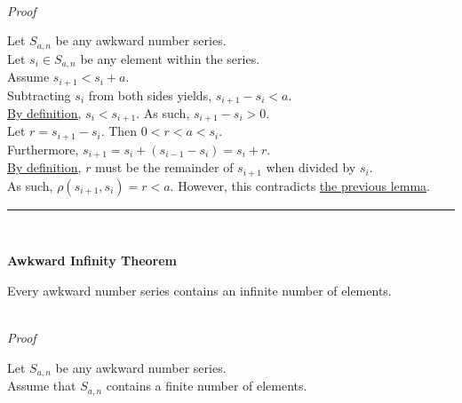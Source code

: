 \documentclass[a4paper,12pt]{article}
\begin{document}
\noindent \\
\textit{Proof}

\noindent Let $S_{a, n}$ be any awkward number series.\\

\noindent Let $s_i \in S_{a, n}$ be any element within the series.\\

\noindent Assume $s_{i + 1} < s_i + a$.\\

\noindent Subtracting $s_i$ from both sides yields, $s_{i + 1} - s_i < a$.\\

\noindent \hyperlink{definition:awkward_number_series}{By definition}, $s_i < s_{i + 1}$. As such, $s_{i + 1} - s_i > 0$.\\

\noindent Let $r = s_{i + 1} - s_i$. Then $0 < r < a < s_i$.\\

\noindent Furthermore, $s_{i + 1} = s_i + (s_{i - 1} - s_i) = s_i + r$.\\

\noindent \hyperlink{theorem:remainder_theorem}{By definition}, $r$ must be the remainder of $s_{i + 1}$ when divided by $s_i$.\\

\noindent As such, $\rho(s_{i + 1}, s_i) = r < a$. However, this contradicts \hyperlink{lemma:non_divisibility_of_elements}{the previous lemma}.

\begin{center}
\noindent\rule{8cm}{0.4pt}
\end{center}
\noindent \\






\label{theorem:infinite_asn}
\hypertarget{theorem:infinite_asn}{}
\begin{tcolorbox}
\textbf{Awkward Infinity Theorem}

Every awkward number series contains an infinite number of elements.
\end{tcolorbox}

\noindent \\
\textit{Proof}

\noindent Let $S_{a,n}$ be any awkward number series.\\

\noindent Assume that $S_{a,n}$ contains a finite number of elements.\\
\end{document}
